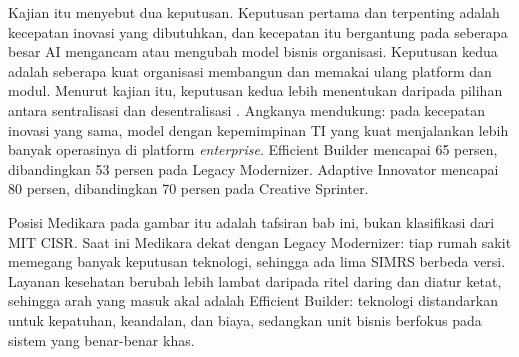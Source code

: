 Kajian itu menyebut dua keputusan. Keputusan pertama dan terpenting adalah
kecepatan inovasi yang dibutuhkan, dan kecepatan itu bergantung pada seberapa
besar AI mengancam atau mengubah model bisnis organisasi. Keputusan kedua
adalah seberapa kuat organisasi membangun dan memakai ulang platform dan
modul. Menurut kajian itu, keputusan kedua lebih menentukan daripada pilihan
antara sentralisasi dan desentralisasi \cite{thorogood2025}. Angkanya
mendukung: pada kecepatan inovasi yang sama, model dengan kepemimpinan TI yang
kuat menjalankan lebih banyak operasinya di platform \textit{enterprise}.
Efficient Builder mencapai 65 persen, dibandingkan 53 persen pada Legacy
Modernizer. Adaptive Innovator mencapai 80 persen, dibandingkan 70 persen pada
Creative Sprinter.

Posisi Medikara pada gambar itu adalah tafsiran bab ini, bukan klasifikasi
dari MIT CISR. Saat ini Medikara dekat dengan Legacy Modernizer: tiap rumah
sakit memegang banyak keputusan teknologi, sehingga ada lima SIMRS berbeda
versi. Layanan kesehatan berubah lebih lambat daripada ritel daring dan
diatur ketat, sehingga arah yang masuk akal adalah Efficient Builder:
teknologi distandarkan untuk kepatuhan, keandalan, dan biaya, sedangkan unit
bisnis berfokus pada sistem yang benar-benar khas.

